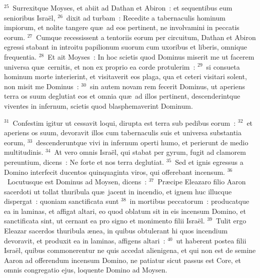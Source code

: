 ${}^{25}$~Surrexitque Moyses, et abiit ad Dathan et Abiron~: et sequentibus eum senioribus Isra\"el,
${}^{26}$~dixit ad turbam~: Recedite a tabernaculis hominum impiorum, et nolite tangere qu\ae\ ad eos pertinent, ne involvamini in peccatis eorum.
${}^{27}$~Cumque recessissent a tentoriis eorum per circuitum, Dathan et Abiron egressi stabant in introitu papilionum suorum cum uxoribus et liberis, omnique frequentia.
${}^{28}$~Et ait Moyses~: In hoc scietis quod Dominus miserit me ut facerem universa qu\ae\ cernitis, et non ex proprio ea corde protulerim~:
${}^{29}$~si consueta hominum morte interierint, et visitaverit eos plaga, qua et ceteri visitari solent, non misit me Dominus~:
${}^{30}$~sin autem novam rem fecerit Dominus, ut aperiens terra os suum deglutiat eos et omnia qu\ae\ ad illos pertinent, descenderintque viventes in infernum, scietis quod blasphemaverint Dominum.


${}^{31}$~Confestim igitur ut cessavit loqui, dirupta est terra sub pedibus eorum~:
${}^{32}$~et aperiens os suum, devoravit illos cum tabernaculis suis et universa substantia eorum,
${}^{33}$~descenderuntque vivi in infernum operti humo, et perierunt de medio multitudinis.
${}^{34}$~At vero omnis Isra\"el, qui stabat per gyrum, fugit ad clamorem pereuntium, dicens~: Ne forte et nos terra deglutiat.
${}^{35}$~Sed et ignis egressus a Domino interfecit ducentos quinquaginta viros, qui offerebant incensum.
${}^{36}$~Locutusque est Dominus ad Moysen, dicens~:
${}^{37}$~Pr\ae cipe Eleazaro filio Aaron sacerdoti ut tollat thuribula qu\ae\ jacent in incendio, et ignem huc illucque dispergat~: quoniam sanctificata sunt
${}^{38}$~in mortibus peccatorum~: producatque ea in laminas, et affigat altari, eo quod oblatum sit in eis incensum Domino, et sanctificata sint, ut cernant ea pro signo et monimento filii Isra\"el.
${}^{39}$~Tulit ergo Eleazar sacerdos thuribula \ae nea, in quibus obtulerant hi quos incendium devoravit, et produxit ea in laminas, affigens altari~:
${}^{40}$~ut haberent postea filii Isra\"el, quibus commonerentur ne quis accedat alienigena, et qui non est de semine Aaron ad offerendum incensum Domino, ne patiatur sicut passus est Core, et omnis congregatio ejus, loquente Domino ad Moysen.


